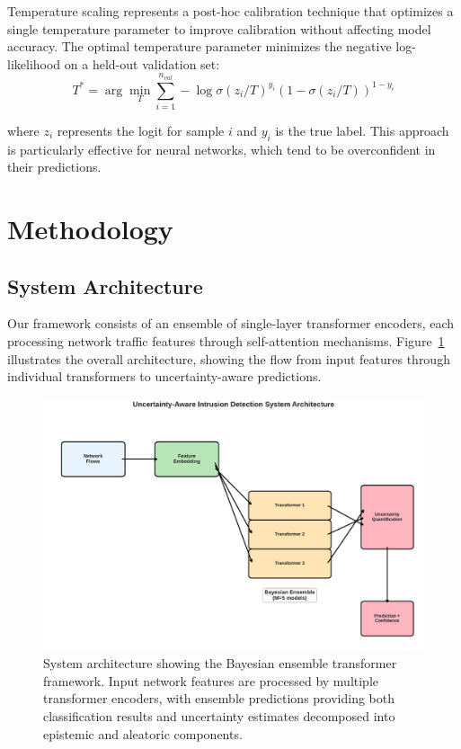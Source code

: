 \documentclass[journal]{IEEEtran}
\begin{document}
Temperature scaling represents a post-hoc calibration technique that optimizes a single temperature parameter to improve calibration without affecting model accuracy. The optimal temperature parameter minimizes the negative log-likelihood on a held-out validation set:
\begin{equation}
T^* = \arg\min_T \sum_{i=1}^{n_{val}} -\log \sigma(z_i/T)^{y_i} (1-\sigma(z_i/T))^{1-y_i}
\end{equation}

where $z_i$ represents the logit for sample $i$ and $y_i$ is the true label. This approach is particularly effective for neural networks, which tend to be overconfident in their predictions.

\section{Methodology}
\label{sec:methodology}

\subsection{System Architecture}

Our framework consists of an ensemble of single-layer transformer encoders, each processing network traffic features through self-attention mechanisms. Figure~\ref{fig:system_overview} illustrates the overall architecture, showing the flow from input features through individual transformers to uncertainty-aware predictions.

\begin{figure}[t]
\centering
\includegraphics[width=0.8\columnwidth]{figures/system_overview.pdf}
\caption{System architecture showing the Bayesian ensemble transformer framework. Input network features are processed by multiple transformer encoders, with ensemble predictions providing both classification results and uncertainty estimates decomposed into epistemic and aleatoric components.}
\label{fig:system_overview}
\end{figure}
\end{document}
